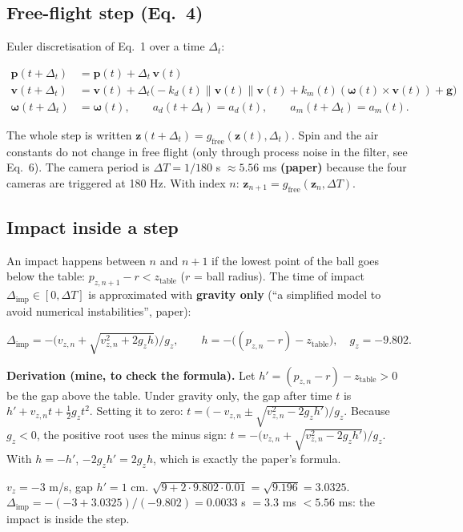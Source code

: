 \documentclass[11pt,a4paper]{article}
\newcommand{\vv}{\mathbf{v}}
\newcommand{\pp}{\mathbf{p}}
\newcommand{\zz}{\mathbf{z}}
\newcommand{\ww}{\boldsymbol{\omega}}
\begin{document}
\subsection{Free-flight step (Eq.~4)}
Euler discretisation of Eq.~1 over a time $\Delta_t$:
\begin{eqbox}
\[
\begin{aligned}
\pp(t+\Delta_t)&=\pp(t)+\Delta_t\,\vv(t)\\
\vv(t+\Delta_t)&=\vv(t)+\Delta_t\big(-k_d(t)\|\vv(t)\|\vv(t)+k_m(t)(\ww(t)\times\vv(t))+\mathbf g\big)\\
\ww(t+\Delta_t)&=\ww(t),\qquad a_d(t+\Delta_t)=a_d(t),\qquad a_m(t+\Delta_t)=a_m(t).
\end{aligned}
\]
\end{eqbox}
The whole step is written $\zz(t+\Delta_t)=g_{\text{free}}(\zz(t),\Delta_t)$. Spin and the air constants do not change in free flight (only through process noise in the filter, see Eq.~6).
The camera period is $\Delta T=1/180$ s $\approx5.56$ ms \textbf{(paper)} because the four cameras are triggered at 180 Hz. With index $n$: $\zz_{n+1}=g_{\text{free}}(\zz_n,\Delta T)$.

\subsection{Impact inside a step}
An impact happens between $n$ and $n+1$ if the lowest point of the ball goes below the table: $p_{z,n+1}-r<z_{\text{table}}$ ($r$ = ball radius).
The time of impact $\Delta_{\text{imp}}\in[0,\Delta T]$ is approximated with \textbf{gravity only} (``a simplified model to avoid numerical instabilities'', paper):
\begin{eqbox}
\[
\Delta_{\text{imp}}=-\Big(v_{z,n}+\sqrt{v_{z,n}^2+2g_z h}\Big)\Big/g_z,\qquad h=-\big((p_{z,n}-r)-z_{\text{table}}\big),\quad g_z=-9.802 .
\]
\end{eqbox}
\textbf{Derivation (mine, to check the formula).} Let $h'=(p_{z,n}-r)-z_{\text{table}}>0$ be the gap above the table. Under gravity only, the gap after time $t$ is $h'+v_{z,n}t+\tfrac12 g_z t^2$.
Setting it to zero: $t=\big(-v_{z,n}\pm\sqrt{v_{z,n}^2-2g_zh'}\big)/g_z$. Because $g_z<0$, the positive root uses the minus sign: $t=-\big(v_{z,n}+\sqrt{v_{z,n}^2-2g_zh'}\big)/g_z$.
With $h=-h'$, $-2g_zh'=2g_zh$, which is exactly the paper's formula. \checkmark

\begin{toy}
$v_z=-3$ m/s, gap $h'=1$ cm. $\sqrt{9+2\cdot9.802\cdot0.01}=\sqrt{9.196}=3.0325$. $\Delta_{\text{imp}}=-(-3+3.0325)/(-9.802)=0.0033$ s $=3.3$ ms $<5.56$ ms: the impact is inside the step.
\end{toy}
\end{document}
